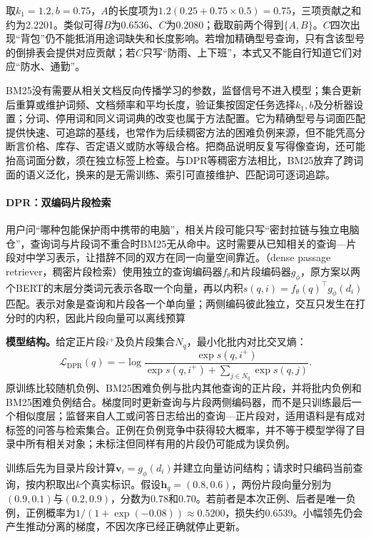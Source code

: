 取$k_1=1.2,b=0.75$，$A$的长度项为$1.2(0.25+0.75\times0.5)=0.75$，三项贡献之和约为2.2201。类似可得$B$为0.6536、$C$为0.2080；截取前两个得到$\{A,B\}$。$C$四次出现“背包”仍不能抵消用途词缺失和长度影响。若增加精确型号查询，只有含该型号的倒排表会提供对应贡献；若$C$只写“防雨、上下班”，本式又不能自行知道它们对应“防水、通勤”。

BM25没有需要从相关文档反向传播学习的参数，监督信号不进入模型；集合更新后重算或维护词频、文档频率和平均长度，验证集按固定任务选择$k_1,b$及分析器设置；分词、停用词和同义词词典的改变也属于方法配置。它为精确型号与词面匹配提供快速、可追踪的基线，也常作为后续稠密方法的困难负例来源，但不能凭高分断言价格、库存、否定语义或防水等级合格。把商品说明反复写得像查询，还可能抬高词面分数，须在独立标签上检查。与DPR等稠密方法相比，BM25放弃了跨词面的语义泛化，换来的是无需训练、索引可直接维护、匹配词可逐词追踪。

\Needspace{100mm}
\paragraph{DPR：双编码片段检索}
\label{sec:rs-search-dpr}

用户问“哪种包能保护雨中携带的电脑”，相关片段可能只写“密封拉链与独立电脑仓”，查询词与片段词不重合时BM25无从命中。这时需要从已知相关的查询—片段对中学习表示，让措辞不同的双方在同一向量空间靠近。（dense passage retriever，稠密片段检索）使用独立的查询编码器$f_\theta$和片段编码器$g_\phi$，原方案以两个BERT的末层分类词元表示各取一个向量，再以内积$s(q,i)=f_\theta(q)^\top g_\phi(d_i)$匹配。表示对象是查询和片段各一个单向量；两侧编码彼此独立，交互只发生在打分时的内积，因此片段向量可以离线预算

\textbf{模型结构。}给定正片段$i^+$及负片段集合$N_q$，最小化批内对比交叉熵：
\begin{equation}
 \mathcal L_{\mathrm{DPR}}(q)=
 -\log\frac{\exp s(q,i^+)}
 {\exp s(q,i^+)+\sum_{j\in N_q}\exp s(q,j)} .
 \label{eq:rs-search-dpr}
\end{equation}
原训练比较随机负例、BM25困难负例与批内其他查询的正片段，并将批内负例和BM25困难负例结合。梯度同时更新查询与片段两侧编码器，而不是只训练最后一个相似度层；监督来自人工或问答日志给出的查询—正片段对，适用语料是有成对标签的问答与检索集合。正例在负例竞争中获得较大概率，并不等于模型学得了目录中所有相关对象；未标注但同样有用的片段仍可能成为误负例。

训练后先为目录片段计算$\bm v_i=g_\phi(d_i)$并建立向量访问结构；请求时只编码当前查询，按内积取出$k$个真实标识。假设$\bm h_q=(0.8,0.6)$，两份片段向量分别为$(0.9,0.1)$与$(0.2,0.9)$，分数为0.78和0.70。若前者是本次正例、后者是唯一负例，正例概率为$1/(1+\exp(-0.08))\approx0.5200$，损失约0.6539。小幅领先仍会产生推动分离的梯度，不因次序已经正确就停止更新。

